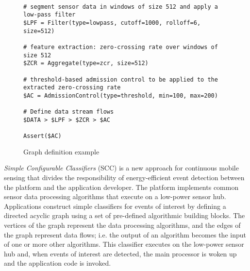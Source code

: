 \begin{figure*}[t]
{\small
	\begin{verbatim}
	
# segment sensor data in windows of size 512 and apply a low-pass filter
$LPF = Filter(type=lowpass, cutoff=1000, rolloff=6, size=512)

# feature extraction: zero-crossing rate over windows of size 512
$ZCR = Aggregate(type=zcr, size=512)

# threshold-based admission control to be applied to the extracted zero-crossing rate
$AC = AdmissionControl(type=threshold, min=100, max=200)

# Define data stream flows
$DATA > $LPF > $ZCR > $AC

Assert($AC)
	\end{verbatim}
}
	\caption{Graph definition example}
    \label{fig:sccLanguageSample}
\end{figure*}


\iffalse
\begin{figure*}[t]
{\small
	\begin{verbatim}
# segment sensor data and apply a low-pass filter
$DATA > window type=rect size=512 overlap=256 | filter type=lowpass cutoff=1000 rolloff=6 > $lpfwin

# extract the zero-crossing rate and perform threshold-based admission control
$lpfwin > extract type=zcr | admissioncontrol type=threshold min=100 max=200 > $aczcr

# check if admission control passed
assert $aczcr

# pass filtered sensor data to application
return $lpfwin
	\end{verbatim}
}
	\caption{Graph definition example}
    \label{fig:sccLanguageSample}
\end{figure*}
\fi

{\em Simple Configurable Classifiers} (SCC) is a new approach for
continuous mobile sensing that divides the responsibility of
energy-efficient event detection between the platform and
the application developer.  The platform implements common sensor data
processing algorithms that execute on a low-power sensor hub.
Applications construct simple classifiers for events of interest by
defining a directed acyclic graph using a set of pre-defined 
algorithmic building blocks.  The vertices
of the graph represent the data processing algorithms, and the 
edges of the graph represent data flows; i.e. the output of an algorithm 
becomes the input of one or more other algorithms.  This classifier 
executes on the low-power sensor hub and, when events of interest 
are detected, the main processor is woken up and the application 
code is invoked.


